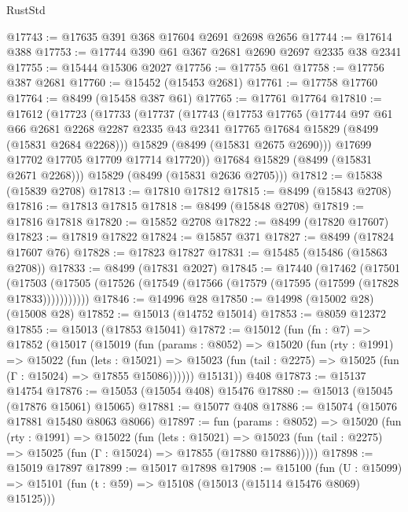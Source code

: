 \begin{lexlean}{RustStd}
\begin{coremodule}
@17743 := @17635 @391 @368 @17604 @2691 @2698 @2656
@17744 := @17614 @388
@17753 := @17744 @390 @61 @367 @2681 @2690 @2697 @2335 @38 @2341
@17755 := @15444 @15306 @2027
@17756 := @17755 @61
@17758 := @17756 @387 @2681
@17760 := @15452 (@15453 @2681)
@17761 := @17758 @17760
@17764 := @8499 (@15458 @387 @61)
@17765 := @17761 @17764
@17810 := @17612
    (@17723
      (@17733
        (@17737
          (@17743
            (@17753
              @17765
              (@17744
                @97
                @61
                @66
                @2681
                @2268
                @2287
                @2335
                @43
                @2341
                @17765
                @17684
                @15829
                (@8499 (@15831 @2684 @2268)))
              @15829
              (@8499 (@15831 @2675 @2690)))
            @17699
            @17702
            @17705
            @17709
            @17714
            @17720))
        @17684
        @15829
        (@8499 (@15831 @2671 @2268)))
      @15829
      (@8499 (@15831 @2636 @2705)))
@17812 := @15838 (@15839 @2708)
@17813 := @17810 @17812
@17815 := @8499 (@15843 @2708)
@17816 := @17813 @17815
@17818 := @8499 (@15848 @2708)
@17819 := @17816 @17818
@17820 := @15852 @2708
@17822 := @8499 (@17820 @17607)
@17823 := @17819 @17822
@17824 := @15857 @371
@17827 := @8499 (@17824 @17607 @76)
@17828 := @17823 @17827
@17831 := @15485 (@15486 (@15863 @2708))
@17833 := @8499 (@17831 @2027)
@17845 := @17440
    (@17462
      (@17501
        (@17503 (@17505 (@17526 (@17549 (@17566 (@17579 (@17595 (@17599 (@17828 @17833)))))))))))
@17846 := @14996 @28
@17850 := @14998 (@15002 @28) (@15008 @28)
@17852 := @15013 (@14752 @15014)
@17853 := @8059 @12372
@17855 := @15013 (@17853 @15041)
@17872 := @15012
    (fun (fn : @7) =>
    @17852
      (@15017
        (@15019
          (fun (params : @8052) =>
          @15020
            (fun (rty : @1991) =>
            @15022
              (fun (lets : @15021) =>
              @15023 (fun (tail : @2275) => @15025 (fun (Γ : @15024) => @17855 @15086))))))
        @15131))
    @408
@17873 := @15137 @14754
@17876 := @15053 (@15054 @408) @15476
@17880 := @15013 (@15045 (@17876 @15061) @15065)
@17881 := @15077 @408
@17886 := @15074 (@15076 @17881 @15480 @8063 @8066)
@17897 := fun (params : @8052) =>
  @15020
    (fun (rty : @1991) =>
    @15022
      (fun (lets : @15021) =>
      @15023 (fun (tail : @2275) => @15025 (fun (Γ : @15024) => @17855 (@17880 @17886)))))
@17898 := @15019 @17897
@17899 := @15017 @17898
@17908 := @15100
    (fun (U : @15099) => @15101 (fun (t : @59) => @15108 (@15013 (@15114 @15476 @8069) @15125)))

\end{coremodule}
\end{lexlean}
